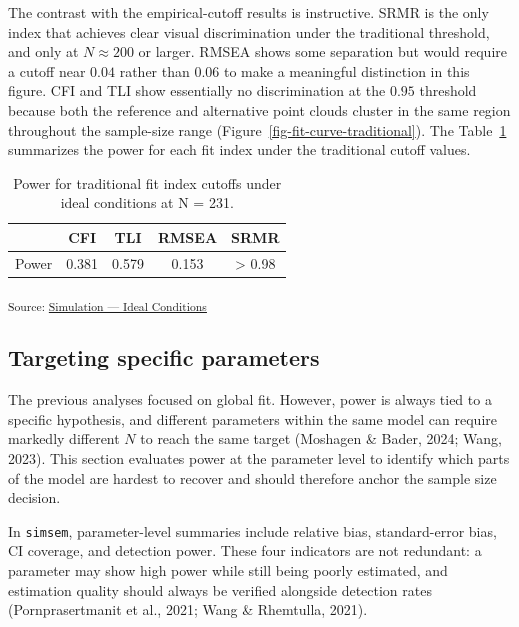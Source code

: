 \documentclass[
  letterpaper,
  DIV=11,
  numbers=noendperiod]{scrartcl}
\begin{document}
The contrast with the empirical-cutoff results is instructive. SRMR is
the only index that achieves clear visual discrimination under the
traditional threshold, and only at \(N \approx 200\) or larger. RMSEA
shows some separation but would require a cutoff near \(0.04\) rather
than \(0.06\) to make a meaningful distinction in this figure. CFI and
TLI show essentially no discrimination at the \(0.95\) threshold because
both the reference and alternative point clouds cluster in the same
region throughout the sample-size range
(Figure~\ref{fig-fit-curve-traditional}). The
Table~\ref{tbl-power-cutoff-traditional-ideal} summarizes the power for
each fit index under the traditional cutoff values.

{

\begin{longtable}[]{@{}lcccc@{}}

\caption{\label{tbl-power-cutoff-traditional-ideal}Power for traditional
fit index cutoffs under ideal conditions at N = 231.}

\tabularnewline

\toprule\noalign{}
& CFI & TLI & RMSEA & SRMR \\
\midrule\noalign{}
\endhead
\bottomrule\noalign{}
\endlastfoot
Power & 0.381 & 0.579 & 0.153 & \textgreater{} 0.98 \\

\end{longtable}

}

\textsubscript{Source:
\href{https://phdpablo.github.io/cfa-power/Scripts/AnalysisScripts/03_simulation_ideal-preview.html\#cell-tbl-power-cutoff-traditional-ideal}{Simulation
--- Ideal Conditions}}

\subsection{Targeting specific
parameters}\label{targeting-specific-parameters}

The previous analyses focused on global fit. However, power is always
tied to a specific hypothesis, and different parameters within the same
model can require markedly different \(N\) to reach the same target
(Moshagen \& Bader, 2024; Wang, 2023). This section evaluates power at
the parameter level to identify which parts of the model are hardest to
recover and should therefore anchor the sample size decision.

In \texttt{simsem}, parameter-level summaries include relative bias,
standard-error bias, CI coverage, and detection power. These four
indicators are not redundant: a parameter may show high power while
still being poorly estimated, and estimation quality should always be
verified alongside detection rates (Pornprasertmanit et al., 2021; Wang
\& Rhemtulla, 2021).
\end{document}
